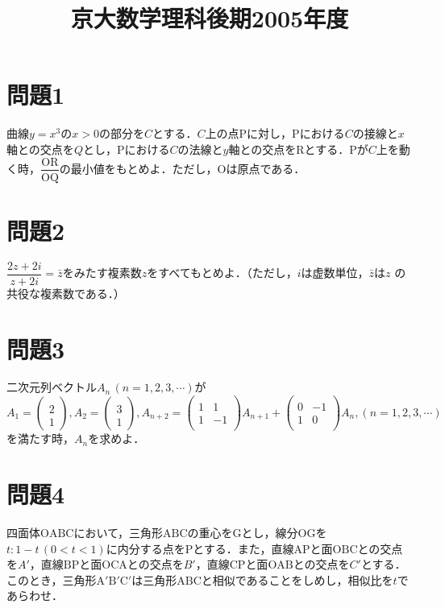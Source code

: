 \documentclass[unicode,12pt, A4j]{ltjsarticle}%
\title{京大数学理科後期2005年度}
\author{}
\date{}
\begin{document}
\maketitle

\section{問題1}
曲線$y=x^3$の$x>0$の部分を$C$とする．$C$上の点$\mathrm{P}$に対し，$\mathrm{P}$における$C$の接線と$x$軸との交点を$Q$とし，$\mathrm{P}$における$C$の法線と$y$軸との交点を$\mathrm{R}$とする．$\mathrm{P}$が$C$上を動く時，$\dfrac{\mathrm{OR}}{\mathrm{OQ}}$の最小値をもとめよ．ただし，$\mathrm{O}$は原点である．
	  
\section{問題2}
$\dfrac{2z+2i}{z+2i}=\bar{z}$をみたす複素数$z$をすべてもとめよ．（ただし，$i$は虚数単位，$\bar{z}$は$z$ の共役な複素数である．）


\section{問題3}
二次元列ベクトル$A_n\, (n=1,2,3,\cdots)$が
\begin{equation}
 A_1=\begin{pmatrix}\\
      2 \\1 
     \end{pmatrix},
 A_2=\begin{pmatrix}\\
      3 \\1 
     \end{pmatrix},
 A_{n+2}=\begin{pmatrix}\\
      1 & 1 \\ 1 & -1 \\ 
     \end{pmatrix}A_{n+1}+
     \begin{pmatrix}\\
      0 & -1 \\ 1 & 0 \\ 
     \end{pmatrix}A_{n},
 (n=1,2,3,\cdots)
\end{equation}
を満たす時，$A_n$を求めよ．

\section{問題4}
四面体$\mathrm{OABC}$において，三角形$\mathrm{ABC}$の重心を$\mathrm{G}$とし，線分$\mathrm{OG}$を$t:1-t\, (0<t<1)$に内分する点を$\mathrm{P}$とする．また，直線$\mathrm{AP}$と面$\mathrm{OBC}$との交点を$A'$，直線$\mathrm{BP}$と面$\mathrm{OCA}$との交点を$B'$，直線$\mathrm{CP}$と面$\mathrm{OAB}$との交点を$C'$とする．このとき，三角形$\mathrm{A'B'C'}$は三角形$\mathrm{ABC}$と相似であることをしめし，相似比を$t$であらわせ．
\end{document}
